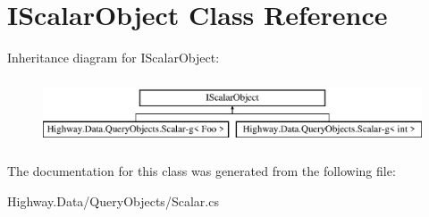 \hypertarget{class_i_scalar_object-g}{\section{I\-Scalar\-Object Class Reference}
\label{class_i_scalar_object-g}
}
Inheritance diagram for I\-Scalar\-Object\-:\begin{figure}[H]
\begin{center}
\leavevmode
\includegraphics[height=1.978799cm]{class_i_scalar_object-g}
\end{center}
\end{figure}


The documentation for this class was generated from the following file\-:\begin{DoxyCompactItemize}
\item 
Highway.\-Data/\-Query\-Objects/Scalar.\-cs\end{DoxyCompactItemize}
